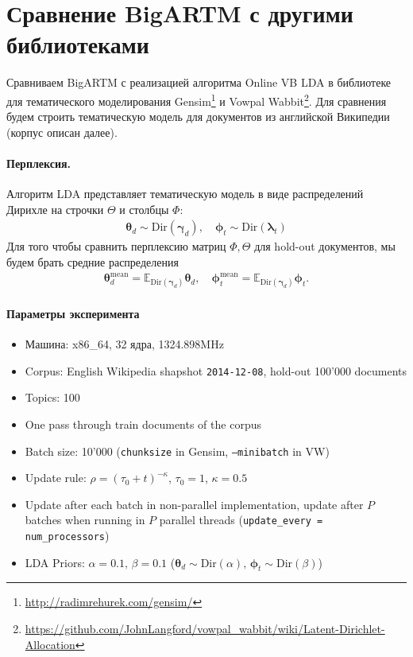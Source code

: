 \documentclass{article}
\renewcommand{\vec}[1]{{\boldsymbol #1}}
\begin{document}
\section{Сравнение BigARTM с другими библиотеками}

Сравниваем BigARTM с реализацией алгоритма Online VB LDA в библиотеке для тематического моделирования Gensim\footnote{\url{http://radimrehurek.com/gensim/}} и Vowpal Wabbit\footnote{\url{https://github.com/JohnLangford/vowpal_wabbit/wiki/Latent-Dirichlet-Allocation}}. Для сравнения будем строить тематическую модель для документов из английской Википедии (корпус описан далее). 

\paragraph{Перплексия.} Алгоритм LDA представляет тематическую модель в виде распределений Дирихле на строчки $\Theta$ и столбцы $\Phi$:
\begin{gather}
	\vec{\theta}_{d} \sim \text{Dir}(\vec{\gamma}_d), \quad \vec{\phi}_{t} \sim \text{Dir}(\vec{\lambda}_t)
\end{gather}
Для того чтобы сравнить перплексию матриц $\Phi, \Theta$ для hold-out документов, мы будем брать средние распределения 
\begin{gather}
	\vec{\theta}^\text{mean}_d = \mathbb{E}_{\text{Dir}(\vec{\gamma}_d)}\vec{\theta}_d, \quad \vec{\phi}^\text{mean}_t = \mathbb{E}_{\text{Dir}(\vec{\gamma}_d)} \vec{\phi}_t.
\end{gather}
 
\paragraph{Параметры эксперимента}
\begin{itemize}
	\item Машина: x86\_64, 32 ядра, 1324.898MHz
	\item Corpus: English Wikipedia shapshot \texttt{2014-12-08}, hold-out 100'000 documents
	\item Topics: 100
	\item One pass through train documents of the corpus
	\item Batch size: 10'000 (\texttt{chunksize} in Gensim, \texttt{--minibatch} in VW)
	\item Update rule: $\rho = (\tau_0 + t)^{-\kappa}$, $\tau_0 = 1$, $\kappa = 0.5$
	\item Update after each batch in non-parallel implementation, update after $P$ batches when running in $P$ parallel threads (\texttt{update\_every = num\_processors})
	\item LDA Priors: $\alpha = 0.1,\, \beta = 0.1$ ($\vec{\theta}_d \sim \text{Dir}(\alpha),\, \vec{\phi}_t \sim \text{Dir}(\beta)$)
\end{itemize}
\end{document}
